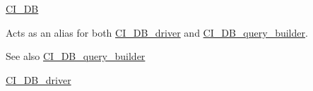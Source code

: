 \hyperlink{class_c_i___d_b}{C\+I\+\_\+\+D\+B}

Acts as an alias for both \hyperlink{class_c_i___d_b__driver}{C\+I\+\_\+\+D\+B\+\_\+driver} and \hyperlink{class_c_i___d_b__query__builder}{C\+I\+\_\+\+D\+B\+\_\+query\+\_\+builder}.

\begin{DoxySeeAlso}{See also}
\hyperlink{class_c_i___d_b__query__builder}{C\+I\+\_\+\+D\+B\+\_\+query\+\_\+builder} 

\hyperlink{class_c_i___d_b__driver}{C\+I\+\_\+\+D\+B\+\_\+driver}
\end{DoxySeeAlso}
